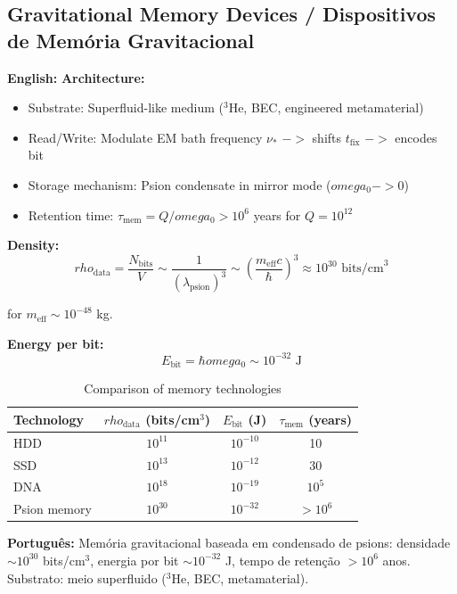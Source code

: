\documentclass[12pt,a4paper]{article}
\def\to{ -> }%
\def\rho{rho}%
\def\omega{omega}%
\begin{document}
\subsection{Gravitational Memory Devices / Dispositivos de Memória Gravitacional}

\textbf{English:} \textbf{Architecture:}
\begin{itemize}
    \item Substrate: Superfluid-like medium ($^3$He, BEC, engineered metamaterial)
    \item Read/Write: Modulate EM bath frequency $\nu_*$ $\to$ shifts $t_{\text{fix}}$ $\to$ encodes bit
    \item Storage mechanism: Psion condensate in mirror mode ($\omega_0 \to 0$)
    \item Retention time: $\tau_{\text{mem}} = Q/\omega_0 > 10^6$ years for $Q = 10^{12}$
\end{itemize}

\textbf{Density:}
\begin{equation}
\rho_{\text{data}} = \frac{N_{\text{bits}}}{V} \sim \frac{1}{(\lambda_{\text{psion}})^3} \sim \left(\frac{m_{\text{eff}}c}{\hbar}\right)^3 \approx 10^{30}\text{ bits/cm}^3
\end{equation}

for $m_{\text{eff}} \sim 10^{-48}$ kg.

\textbf{Energy per bit:}
\begin{equation}
E_{\text{bit}} = \hbar\omega_0 \sim 10^{-32}\text{ J}
\end{equation}

\begin{table}[H]
\centering
\begin{tabular}{lccc}
\toprule
\textbf{Technology} & $\rho_{\text{data}}$ (bits/cm$^3$) & $E_{\text{bit}}$ (J) & $\tau_{\text{mem}}$ (years) \\
\midrule
HDD & $10^{11}$ & $10^{-10}$ & 10 \\
SSD & $10^{13}$ & $10^{-12}$ & 30 \\
DNA & $10^{18}$ & $10^{-19}$ & $10^5$ \\
Psion memory & $10^{30}$ & $10^{-32}$ & $>10^6$ \\
\bottomrule
\end{tabular}
\caption{Comparison of memory technologies}
\end{table}

\textbf{Português:} Memória gravitacional baseada em condensado de psions: densidade $\sim 10^{30}$ bits/cm$^3$, energia por bit $\sim 10^{-32}$ J, tempo de retenção $>10^6$ anos. Substrato: meio superfluido ($^3$He, BEC, metamaterial).
\end{document}
